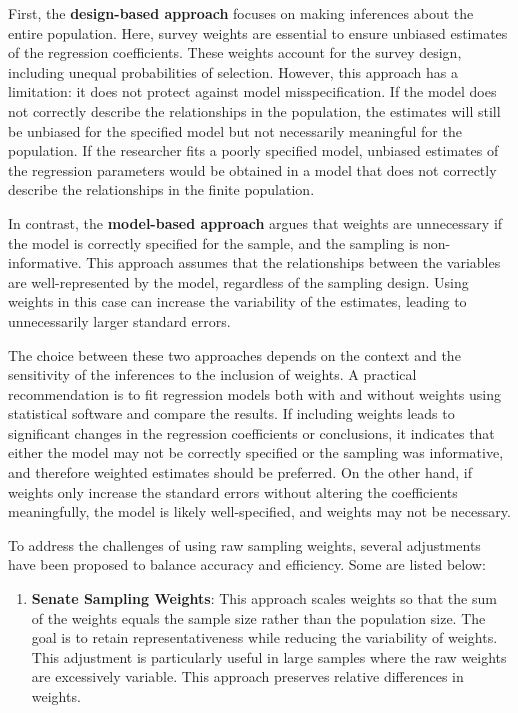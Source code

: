 \documentclass[
  12pt,
]{book}
\providecommand{\tightlist}{%
  \setlength{\itemsep}{0pt}\setlength{\parskip}{0pt}}
\begin{document}
First, the \textbf{design-based approach} focuses on making inferences about the entire population. Here, survey weights are essential to ensure unbiased estimates of the regression coefficients. These weights account for the survey design, including unequal probabilities of selection. However, this approach has a limitation: it does not protect against model misspecification. If the model does not correctly describe the relationships in the population, the estimates will still be unbiased for the specified model but not necessarily meaningful for the population. If the researcher fits a poorly specified model, unbiased estimates of the regression parameters would be obtained in a model that does not correctly describe the relationships in the finite population.

In contrast, the \textbf{model-based approach} argues that weights are unnecessary if the model is correctly specified for the sample, and the sampling is non-informative. This approach assumes that the relationships between the variables are well-represented by the model, regardless of the sampling design. Using weights in this case can increase the variability of the estimates, leading to unnecessarily larger standard errors.

The choice between these two approaches depends on the context and the sensitivity of the inferences to the inclusion of weights. A practical recommendation is to fit regression models both with and without weights using statistical software and compare the results. If including weights leads to significant changes in the regression coefficients or conclusions, it indicates that either the model may not be correctly specified or the sampling was informative, and therefore weighted estimates should be preferred. On the other hand, if weights only increase the standard errors without altering the coefficients meaningfully, the model is likely well-specified, and weights may not be necessary.

To address the challenges of using raw sampling weights, several adjustments have been proposed to balance accuracy and efficiency. Some are listed below:

\begin{enumerate}
\def\labelenumi{\arabic{enumi}.}
\tightlist
\item
  \textbf{Senate Sampling Weights}: This approach scales weights so that the sum of the weights equals the sample size rather than the population size. The goal is to retain representativeness while reducing the variability of weights. This adjustment is particularly useful in large samples where the raw weights are excessively variable. This approach preserves relative differences in weights.
\end{enumerate}
\end{document}
